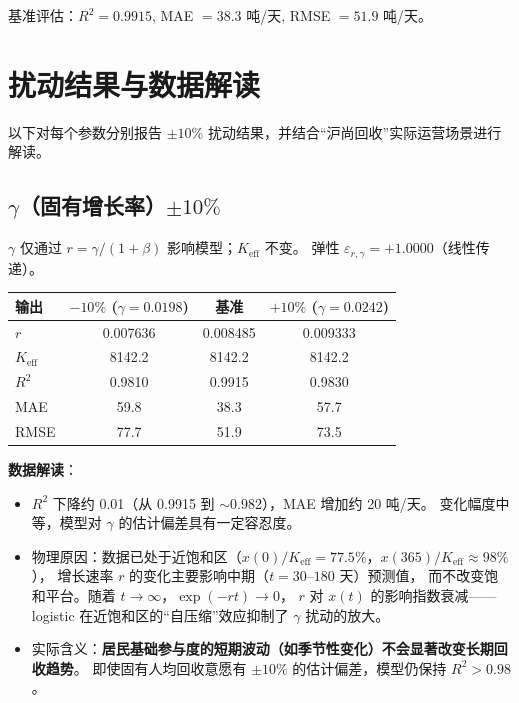 \documentclass[12pt,a4paper]{article}
\begin{document}
基准评估：$R^2 = 0.9915$, MAE $= 38.3$ 吨/天, RMSE $= 51.9$ 吨/天。

\section{扰动结果与数据解读}

以下对每个参数分别报告 $\pm 10\%$ 扰动结果，并结合``沪尚回收''实际运营场景进行解读。

\subsection{$\gamma$（固有增长率）$\pm 10\%$}

$\gamma$ 仅通过 $r = \gamma/(1+\beta)$ 影响模型；$K_{\text{eff}}$ 不变。
弹性 $\varepsilon_{r,\gamma} = +1.0000$（线性传递）。

\begin{center}
\begin{tabular}{lccc}
\toprule
输出 & $-10\%$ ($\gamma = 0.0198$) & 基准 & $+10\%$ ($\gamma = 0.0242$) \\
\midrule
$r$      & 0.007636 & 0.008485 & 0.009333 \\
$K_{\text{eff}}$ & 8142.2 & 8142.2 & 8142.2 \\
$R^2$    & 0.9810 & 0.9915 & 0.9830 \\
MAE      & 59.8 & 38.3 & 57.7 \\
RMSE     & 77.7 & 51.9 & 73.5 \\
\bottomrule
\end{tabular}
\end{center}

\textbf{数据解读}：
\begin{itemize}
  \item $R^2$ 下降约 0.01（从 0.9915 到 $\sim$0.982），MAE 增加约 20 吨/天。
        变化幅度中等，模型对 $\gamma$ 的估计偏差具有一定容忍度。
  \item 物理原因：数据已处于近饱和区（$x(0)/K_{\text{eff}} = 77.5\%$，$x(365)/K_{\text{eff}} \approx 98\%$），
        增长速率 $r$ 的变化主要影响中期（$t = 30$--$180$ 天）预测值，
        而不改变饱和平台。随着 $t \to \infty$，$\exp(-rt) \to 0$，
        $r$ 对 $x(t)$ 的影响指数衰减——logistic 在近饱和区的``自压缩''效应抑制了 $\gamma$ 扰动的放大。
  \item 实际含义：\textbf{居民基础参与度的短期波动（如季节性变化）不会显著改变长期回收趋势}。
        即使固有人均回收意愿有 $\pm 10\%$ 的估计偏差，模型仍保持 $R^2 > 0.98$。
\end{itemize}
\end{document}
